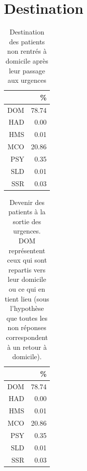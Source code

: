 \documentclass[12pt,english,french,twoside]{report}\usepackage[]{graphicx}\usepackage[]{color}
\begin{document}
\section{Destination}
\begin{table}[ht]
\centering
\begin{tabular}{rr}
  \hline
 & \% \\ 
  \hline
DOM & 78.74 \\ 
  HAD & 0.00 \\ 
  HMS & 0.01 \\ 
  MCO & 20.86 \\ 
  PSY & 0.35 \\ 
  SLD & 0.01 \\ 
  SSR & 0.03 \\ 
   \hline
\end{tabular}
\caption{Destination des patients non rentrés à domicile après leur passage aux urgences} 
\label{tab.dest.hosp}
\end{table}
\begin{table}[ht]
\centering
\begin{tabular}{rr}
  \hline
 & \% \\ 
  \hline
DOM & 78.74 \\ 
  HAD & 0.00 \\ 
  HMS & 0.01 \\ 
  MCO & 20.86 \\ 
  PSY & 0.35 \\ 
  SLD & 0.01 \\ 
  SSR & 0.03 \\ 
   \hline
\end{tabular}
\caption{Devenir des patients à la sortie des urgences. DOM représentent ceux qui sont repartis vers leur domicile ou ce qui en tient lieu (sous l'hypothèse que toutes les non réponses correspondent à un retour à domicile).} 
\label{tab.dest}
\end{table}
\end{document}
